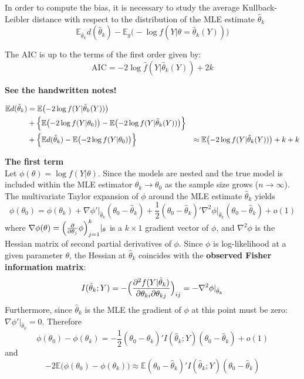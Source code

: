 \documentclass[a4paper]{article}
\newcommand{\ex}{\mathbb{E}}
\begin{document}
In order to compute the bias, it is necessary to study the average Kullback-Leibler
distance with respect to the distribution of the MLE estimate $\hat{\theta}_k$
\[
\ex_{\hat{\theta}_k} d(\hat{\theta}_k)
- \ex_g\bigl(- \log f(Y|\theta = \hat{\theta}_k(Y)) \bigr)
\]

The AIC is up to the terms of the first order given by:
\[\text{AIC} = - 2 \log \hat{f}(Y|\hat{\theta}_k(Y)) + 2k \]

\textbf{ See the handwritten notes! }

\begin{align*}
	\ex d(\hat{\theta}_k)
	&= \ex\bigl( -2\log f(Y|\hat{\theta}_k(Y)) \bigr)\\
	&+ \Bigl\{ \ex\bigl( -2\log f(Y|\theta_0) \bigr)
		- \ex\bigl( -2\log f(Y|\hat{\theta}_k(Y)) \bigr) \Bigr\}\\
	&+ \Bigl\{ \ex d(\hat{\theta}_k)
		- \ex\bigl( -2\log f(Y|\theta_0) \bigr) \Bigr\}
	&\approx \ex\bigl( -2\log f(Y|\hat{\theta}_k(Y)) \bigr) + k + k
\end{align*}

\noindent \textbf{The first term}\hfill\\
Let $\phi(\theta) = \log f(Y|\theta)$. Since the models are nested and the true
model is included within the MLE estimator $\theta_k \to \theta_0$ as the sample
size grows ($n\to \infty$). The multivariate Taylor expansion of $\phi$ around
the MLE estimate $\hat{\theta}_k$ yields
\[
  \phi(\theta_0)
= \phi(\theta_k)
+ \nabla \phi' \rvert_{\hat{\theta}_k} (\theta_0 - \hat{\theta}_k)
+ \frac{1}{2} (\theta_0 - \hat{\theta}_k)' \nabla^2\phi \rvert_{\hat{\theta}_k} (\theta_0 - \hat{\theta}_k)
+ o(1)
\]
where $\nabla \phi(\theta) = \Bigl( \frac{\partial}{\partial \theta_j} \phi \Bigr)_{j=1}^k\rvert_\theta$
is a $k\times 1$ gradient vector of $\phi$, and $\nabla^2\phi$ is the Hessian matrix
of second partial derivatives of $\phi$. Since $\phi$ is log-likelihood at a given
parameter $\theta$, the Hessian at $\hat{\theta}_k$ coincides with the \textbf{observed
Fisher information matrix}:
\[
I(\hat{\theta}_k;Y)
= - \Bigl( \frac{\partial^2 f(Y|\hat{\theta}_k) }{\partial \theta_{ki}\partial \theta_{kj}} \Bigr)_{ij}
= - \nabla^2\phi \rvert_{\hat{\theta}_k}
\]
Furthermore, since $\hat{\theta}_k$ is the MLE the gradient of $\phi$ at this point
must be zero: $\nabla \phi' \rvert_{\hat{\theta}_k} = 0$. Therefore
\[
\phi(\theta_0) - \phi(\theta_k)
=
- \frac{1}{2} (\theta_0 - \hat{\theta}_k)' I( \hat{\theta}_k; Y ) (\theta_0 - \hat{\theta}_k)
+ o(1)
\]
and
\[
-2 \ex \bigl( \phi(\theta_0) - \phi(\theta_k) \bigr)
\approx
\ex (\theta_0 - \hat{\theta}_k)' I( \hat{\theta}_k; Y ) (\theta_0 - \hat{\theta}_k)
\]
\end{document}
